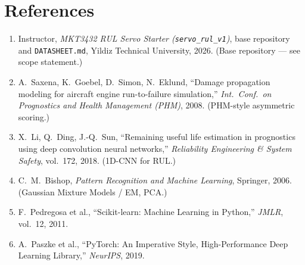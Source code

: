\documentclass[11pt,a4paper]{article}
\newcommand{\code}[1]{\texttt{\small #1}}
\begin{document}
\section{References}

\begin{enumerate}[nosep]
  \item Instructor, \emph{MKT3432 RUL Servo Starter (\code{servo\_rul\_v1})},
        base repository and \code{DATASHEET.md}, Yildiz Technical University,
        2026. (Base repository --- see scope statement.)
  \item A.\ Saxena, K.\ Goebel, D.\ Simon, N.\ Eklund, ``Damage propagation
        modeling for aircraft engine run-to-failure simulation,'' \emph{Int.\
        Conf.\ on Prognostics and Health Management (PHM)}, 2008.
        (PHM-style asymmetric scoring.)
  \item X.\ Li, Q.\ Ding, J.-Q.\ Sun, ``Remaining useful life estimation in
        prognostics using deep convolution neural networks,'' \emph{Reliability
        Engineering \& System Safety}, vol.\ 172, 2018. (1D-CNN for RUL.)
  \item C.\ M.\ Bishop, \emph{Pattern Recognition and Machine Learning},
        Springer, 2006. (Gaussian Mixture Models / EM, PCA.)
  \item F.\ Pedregosa et al., ``Scikit-learn: Machine Learning in Python,''
        \emph{JMLR}, vol.\ 12, 2011.
  \item A.\ Paszke et al., ``PyTorch: An Imperative Style, High-Performance Deep
        Learning Library,'' \emph{NeurIPS}, 2019.
\end{enumerate}
\end{document}
